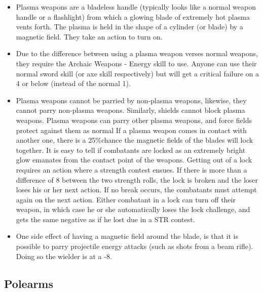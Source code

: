 \documentclass[twoside]{book}
\begin{document}
\begin{itemize}
      
  \item Plasma weapons are a bladeless handle (typically looks like a normal weapon handle or a flashlight) from which a glowing blade of extremely hot plasma vents forth. The plasma is held in the shape of a cylinder (or blade) by a magnetic field. They take an action to turn on.
  \item Due to the difference between using a plasma weapon verses normal weapons, they require the Archaic Weapons - Energy skill to use. Anyone can use their normal sword skill (or axe skill respectively) but will get a critical failure on a 4 or below (instead of the normal 1).
  \item Plasma weapons cannot be parried by non-plasma weapons, likewise, they cannot parry non-plasma weapons. Similarly, shields cannot block plasma weapons. Plasma weapons can parry other plasma weapons, and force fields protect against them as normal If a plasma weapon comes in contact with another one, there is a 25\%chance the magnetic fields of the blades will lock together. It is easy to tell if combatants are locked as an extremely bright glow emanates from the contact point of the weapons. Getting out of a lock requires an action where a strength contest ensues. If there is more than a difference of 8 between the two strength rolls, the lock is broken and the loser loses his or her next action. If no break occurs, the combatants must attempt again on the next action. Either combatant in a lock can turn off their weapon, in which case he or she automatically loses the lock challenge, and gets the same negative as if he lost due in a STR contest.
  \item One side effect of having a magnetic field around the blade, is that it is possible to parry projectile energy attacks (such as shots from a beam rifle). Doing so the wielder is at a -8.
\end{itemize}
  
    

\subsection{Polearms}
    
\end{document}
